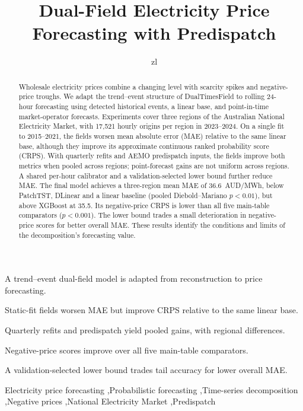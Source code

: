 \documentclass[preprint,12pt]{elsarticle}
\begin{document}
\begin{frontmatter}

\title{Dual-Field Electricity Price Forecasting with Predispatch}

\author[inst1]{zl}
\ead{[e-mail]}

\begin{abstract}
Wholesale electricity prices combine a changing level with scarcity spikes and negative-price troughs. We adapt the trend--event structure of DualTimesField to rolling 24-hour forecasting using detected historical events, a linear base, and point-in-time market-operator forecasts. Experiments cover three regions of the Australian National Electricity Market, with 17{,}521 hourly origins per region in 2023--2024. On a single fit to 2015--2021, the fields worsen mean absolute error (MAE) relative to the same linear base, although they improve its approximate continuous ranked probability score (CRPS). With quarterly refits and AEMO predispatch inputs, the fields improve both metrics when pooled across regions; point-forecast gains are not uniform across regions. A shared per-hour calibrator and a validation-selected lower bound further reduce MAE. The final model achieves a three-region mean MAE of 36.6~AUD/MWh, below PatchTST, DLinear and a linear baseline (pooled Diebold--Mariano $p<0.01$), but above XGBoost at 35.5. Its negative-price CRPS is lower than all five main-table comparators ($p<0.001$). The lower bound trades a small deterioration in negative-price scores for better overall MAE. These results identify the conditions and limits of the decomposition's forecasting value.
\end{abstract}

\begin{highlights}
\item A trend--event dual-field model is adapted from reconstruction to price forecasting.
\item Static-fit fields worsen MAE but improve CRPS relative to the same linear base.
\item Quarterly refits and predispatch yield pooled gains, with regional differences.
\item Negative-price scores improve over all five main-table comparators.
\item A validation-selected lower bound trades tail accuracy for lower overall MAE.
\end{highlights}

\begin{keyword}
Electricity price forecasting \sep Probabilistic forecasting \sep Time-series decomposition \sep Negative prices \sep National Electricity Market \sep Predispatch
\end{keyword}

\end{frontmatter}
\end{document}
